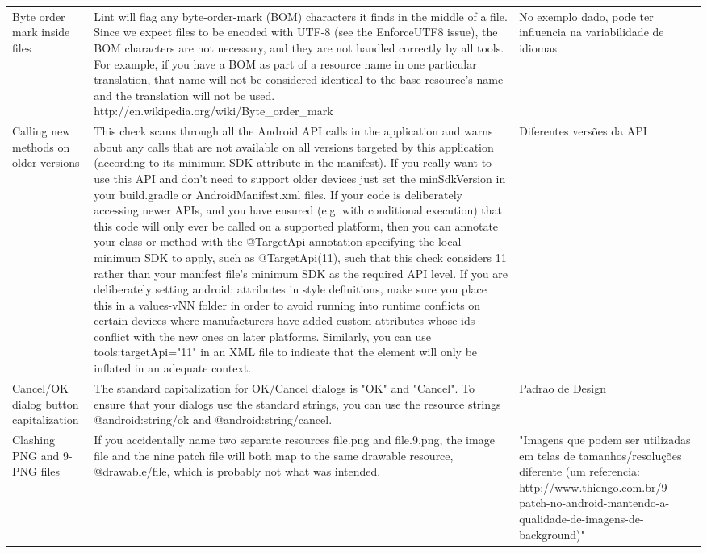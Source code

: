 \begin{landscape}
\begin{longtable}{p{30mm}|p{180mm}|p{25mm}}
Byte order mark inside files & Lint will flag any byte-order-mark (BOM) characters
it finds in the middle of a file. Since we expect files to be encoded with UTF-8
(see the EnforceUTF8 issue), the BOM characters are not necessary, and they are
not handled correctly by all tools. For example, if you have a BOM as part of a
resource name in one particular translation, that name will not be considered
identical to the base resource's name and the translation will not be used.
http://en.wikipedia.org/wiki/Byte\_order\_mark
& No exemplo dado, pode ter influencia na variabilidade de idiomas\\
 
Calling new methods on older versions
&This check scans through all the Android API calls in the application and warns about any calls that are not available on all versions targeted by this application (according to its minimum SDK attribute in the manifest). If you really want to use this API and don't need to support older devices just set the minSdkVersion in your build.gradle or AndroidManifest.xml files. If your code is deliberately accessing newer APIs, and you have ensured (e.g. with conditional execution) that this code will only ever be called on a supported platform, then you can annotate your class or method with the @TargetApi annotation specifying the local minimum SDK to apply, such as @TargetApi(11), such that this check considers 11 rather than your manifest file's minimum SDK as the required API level. If you are deliberately setting android: attributes in style definitions, make sure you place this in a values-vNN folder in order to avoid running into runtime conflicts on certain devices where manufacturers have added custom attributes whose ids conflict with the new ones on later platforms. Similarly, you can use tools:targetApi="11" in an XML file to indicate that the element will only be inflated in an adequate context.
&Diferentes versões da API\\

Cancel/OK dialog button capitalization
&The standard capitalization for OK/Cancel dialogs is "OK" and "Cancel". To ensure that your dialogs use the standard strings, you can use the resource strings @android:string/ok and @android:string/cancel.
&Padrao de Design\\

Clashing PNG and 9-PNG files
&If you accidentally name two separate resources file.png and file.9.png, the image file and the nine patch file will both map to the same drawable resource, @drawable/file, which is probably not what was intended.
&"Imagens que podem ser utilizadas em telas de tamanhos/resoluções diferente
(um referencia: http://www.thiengo.com.br/9-patch-no-android-mantendo-a-qualidade-de-imagens-de-background)"\\


\end{longtable}
\end{landscape}
